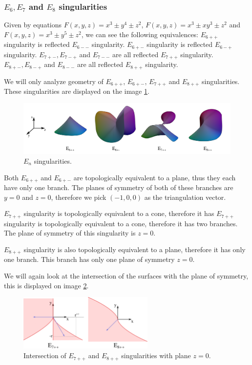 \begin{definition}
\subsubsection*{$E_6, E_7$ and $E_8$ singularities}

Given by equations $F(x,y,z)=x^3\pm y^4\pm z^2$, $F(x,y,z)=x^3\pm xy^3\pm z^2$
and $F(x,y,z)=x^3\pm y^5\pm z^2$, we can see the following equivalences:
$E_{6++}$ singularity is reflected $E_{6--}$ singularity.
$E_{6+-}$ singularity is reflected $E_{6-+}$ singularity.
$E_{7+-}, E_{7-+}$ and $E_{7--}$ are all reflected $E_{7++}$ singularity.
$E_{8+-}, E_{8-+}$ and $E_{8--}$ are all reflected $E_{8++}$ singularity.

We will only analyze geometry of $E_{6++}$, $E_{6+-}$, $E_{7++}$ and $E_{8++}$
singularities. These singularities are displayed on the image \ref{img:12}.


\begin{figure}
    \centerline{\includegraphics[width=1\textwidth]{images/img12}}
    \caption[$E_n$ singularities.]
    {$E_n$ singularities. \cite{singsurf}}
    \label{img:12}
\end{figure}
Both $E_{6++}$ and $E_{6+-}$ are topologically equivalent to a plane, thus
they each have only one branch. The planes of symmetry of both of these 
branches are $y=0$ and $z=0$, therefore we pick $(-1, 0, 0)$ as the
triangulation vector.

$E_{7++}$ singularity is topologically equivalent to a cone, therefore it has
$E_{7++}$ singularity is topologically equivalent to a cone, therefore it has
two branches. The plane of symmetry of this singularity is $z=0$.

$E_{8++}$ singularity is also topologically equivalent to a plane, therefore
it has only one branch. This branch has only one plane of symmetry $z=0$.

We will again look at the intersection of the surfaces with the plane of 
symmetry, this is displayed on image \ref{img:10}.

\begin{figure}
    \centerline{\includegraphics[width=0.6\textwidth]{images/img10}}
    \caption[Intersection of $E_{7++}$ and $E_{8++}$ singularities with 
    plane $z=0$.]
    {Intersection of $E_{7++}$ and $E_{8++}$ singularities with 
    plane $z=0$.}
    \label{img:10}
\end{figure}


\end{definition}
